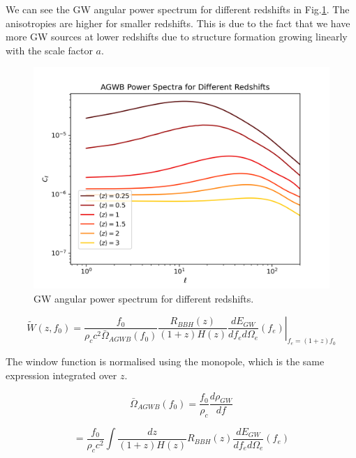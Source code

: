 We can see the GW angular power spectrum for different redshifts in Fig.\ref{plot_Cl_redshift}.
The anisotropies are higher for smaller redshifts. This is due to the fact that we have more GW sources at lower redshifts due to structure formation growing linearly with the scale factor $a$.

\begin{figure}[h]
 \centering
 \includegraphics[width=0.7\linewidth]{Images/diff_window_z.png}
 \caption{GW angular power spectrum for different redshifts.}
 \label{plot_Cl_redshift}
\end{figure} 

\begin{equation}
\label{window}
    \tilde{W}(z, f_0)=\frac{f_0}{\rho_c c^2 \bar{\Omega}_{AGWB}(f_0)}
    \frac{R_{BBH}(z)}{(1+z)H(z)} \left. \frac{dE_{GW}}{df_e d\Omega_e}(f_e)\right|_{f_e=(1+z)f_0}
\end{equation}

The window function is normalised using the monopole, which is the same expression integrated over $z$.

\begin{equation}
    \bar{\Omega}_{AGWB}(f_0)= \frac{f_0}{\rho_c}\frac{d\rho_{GW}}{df}
\end{equation}

\begin{equation}
    = \frac{f_0}{\rho_c c^2 } \int \frac{dz}{(1+z)H(z)} R_{BBH}(z) \frac{dE_{GW}}{df_e d\Omega_e}(f_e)
\end{equation}

